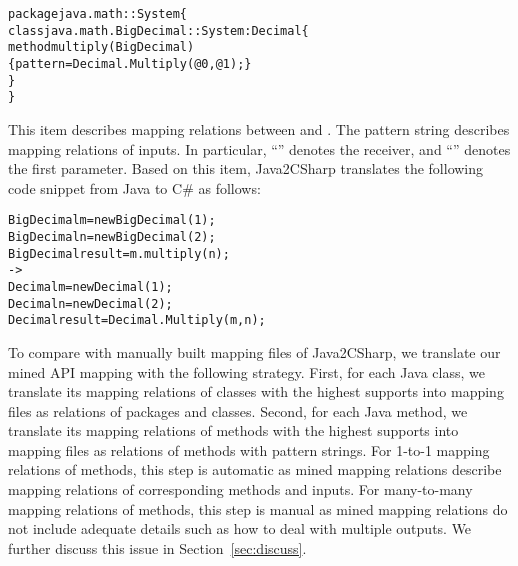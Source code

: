 \begin{CodeOut}\vspace*{-2ex}
\begin{alltt}
package java.math :: System \{
  class java.math.BigDecimal :: System:Decimal \{
    method multiply(BigDecimal)
       \{ pattern =  Decimal.Multiply(@0, @1); \}
  \}
\}
\end{alltt}
\end{CodeOut}\vspace*{-2ex}

This item describes mapping relations between  and . The
pattern string describes mapping relations of inputs. In particular,
``'' denotes the receiver, and ``'' denotes
the first parameter. Based on this item, Java2CSharp translates the
following code snippet from Java to C\# as follows:

\begin{CodeOut}\vspace*{-2ex}
\begin{alltt}
  BigDecimal m = new BigDecimal(1);
  BigDecimal n = new BigDecimal(2);
  BigDecimal result = m.multiply(n);
  ->
  Decimal m = new Decimal(1);
  Decimal n = new Decimal(2);
  Decimal result = Decimal.Multiply(m,n);
\end{alltt}
\end{CodeOut}\vspace*{-2ex}

To compare with manually built mapping files of Java2CSharp, we
translate our mined API mapping with the following strategy. First,
for each Java class, we translate its mapping relations of classes
with the highest supports into mapping files as relations of
packages and classes. Second, for each Java method, we translate its
mapping relations of methods with the highest supports into mapping
files as relations of methods with pattern strings. For 1-to-1
mapping relations of methods, this step is automatic as mined
mapping relations describe mapping relations of corresponding
methods and inputs. For many-to-many mapping relations of methods,
this step is manual as mined mapping relations do not include
adequate details such as how to deal with multiple outputs. We
further discuss this issue in Section~\ref{sec:discuss}.


